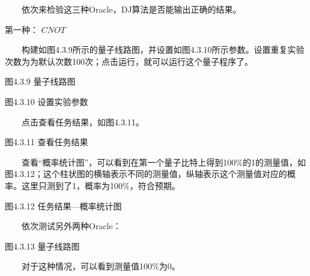 \documentclass[a4paper,11pt,english]{sphinxmanual}
\begin{document}
\sphinxAtStartPar
  依次来检验这三种Oracle，DJ算法是否能输出正确的结果。

\sphinxAtStartPar
第一种： \(CNOT\)

\sphinxAtStartPar
  构建如图4.3.9所示的量子线路图，并设置如图4.3.10所示参数。设置重复实验次数为为默认次数100次；点击运行，就可以运行这个量子程序了。


\begin{center}图4.3.9 量子线路图
\end{center}

\begin{center}图4.3.10 设置实验参数
\end{center}
\sphinxAtStartPar
  点击查看任务结果，如图4.3.11。


\begin{center}图4.3.11 查看任务结果
\end{center}
\sphinxAtStartPar
  查看“概率统计图”，可以看到在第一个量子比特上得到100\%的1的测量值，如图4.3.12；这个柱状图的横轴表示不同的测量值，纵轴表示这个测量值对应的概率。这里只测到了1，概率为100\%，符合预期。


\begin{center}图4.3.12 任务结果—概率统计图
\end{center}
\sphinxAtStartPar
  依次测试另外两种Oracle：


\begin{center}图4.3.13 量子线路图
\end{center}
\sphinxAtStartPar
  对于这种情况，可以看到测量值100\%为0。

\end{document}
